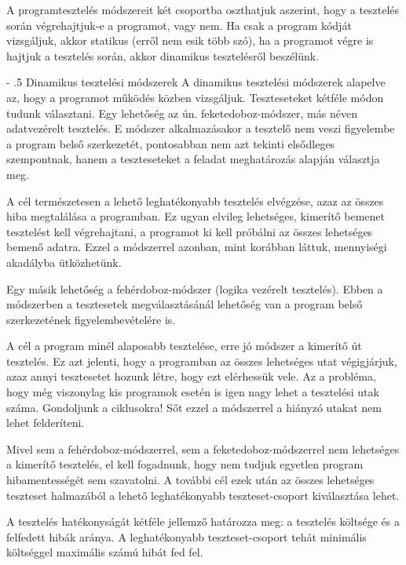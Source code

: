 \documentclass[margin=0px]{article}
\makeatletter
\renewcommand\paragraph{%
	\@startsection{paragraph}{4}{0mm}%
	{-\baselineskip}%
	{.5\baselineskip}%
	{\normalfont\normalsize\bfseries}}
\makeatother
\begin{document}
A programtesztelés módszereit két csoportba oszthatjuk aszerint, hogy a tesztelés során végrehajtjuk-e a programot, vagy nem. Ha csak a program kódját vizsgáljuk, akkor statikus (erről nem esik több szó), ha a programot végre is hajtjuk a tesztelés során, akkor dinamikus tesztelésről beszélünk.

\paragraph{Dinamikus tesztelési módszerek}
A dinamikus tesztelési módszerek alapelve az, hogy a programot működés közben vizsgáljuk. Teszteseteket kétféle módon tudunk választani. Egy lehetőség az ún. feketedoboz-módszer, más néven adatvezérelt tesztelés. E módszer alkalmazásakor a tesztelő nem veszi figyelembe a program belső szerkezetét, pontosabban nem azt tekinti elsődleges szempontnak, hanem a teszteseteket a feladat meghatározás alapján választja meg.

A cél természetesen a lehető leghatékonyabb tesztelés elvégzése, azaz az összes hiba megtalálása a programban. Ez ugyan elvileg lehetséges, kimerítő bemenet tesztelést kell végrehajtani, a programot ki kell próbálni az összes lehetséges bemenő adatra. Ezzel a módszerrel azonban, mint korábban láttuk, mennyiségi akadályba ütközhetünk.

Egy másik lehetőség a fehérdoboz-módszer (logika vezérelt tesztelés). Ebben a módszerben a tesztesetek megválasztásánál lehetőség van a program belső szerkezetének figyelembevételére is.

A cél a program minél alaposabb tesztelése, erre jó módszer a kimerítő út tesztelés. Ez azt jelenti, hogy a programban az összes lehetséges utat végigjárjuk, azaz annyi tesztesetet hozunk létre, hogy ezt elérhessük vele. Az a probléma, hogy még viszonylag kis programok esetén is igen nagy lehet a tesztelési utak száma. Gondoljunk a ciklusokra! Sőt ezzel a módszerrel a hiányzó utakat nem lehet felderíteni.

Mivel sem a fehérdoboz-módszerrel, sem a feketedoboz-módszerrel nem lehetséges a kimerítő tesztelés, el kell fogadnunk, hogy nem tudjuk egyetlen program hibamentességét sem szavatolni. A további cél ezek után az összes lehetséges teszteset halmazából a lehető leghatékonyabb teszteset-csoport kiválasztása lehet.

A tesztelés hatékonyságát kétféle jellemző határozza meg: a tesztelés költsége és a felfedett hibák aránya. A leghatékonyabb teszteset-csoport tehát minimális költséggel maximális számú hibát fed fel.
\end{document}
